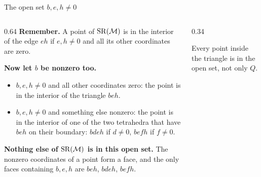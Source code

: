 \begin{frame}{The open set \(b,e,h\ne0\)}
\begin{columns}[c]
\begin{column}{0.64\textwidth}
\textbf{Remember.} A point of \(\operatorname{SR}(\mathcal M)\) is in the interior of the edge \(eh\) if \(e,h\ne0\) and all its other coordinates are zero.
\par\smallskip
\textbf{Now let \(b\) be nonzero too.}
\begin{itemize}
\setlength{\itemsep}{2pt}
\item \(b,e,h\ne0\) and all other coordinates zero: the point is in the interior of the triangle \(beh\).
\item \(b,e,h\ne0\) and something else nonzero: the point is in the interior of one of the two tetrahedra that have \(beh\) on their boundary: \(bdeh\) if \(d\ne0\), \(befh\) if \(f\ne0\).
\end{itemize}
\textbf{Nothing else of \(\operatorname{SR}(\mathcal M)\) is in this open set.} The nonzero coordinates of a point form a face, and the only faces containing \(b,e,h\) are \(beh\), \(bdeh\), \(befh\).
\end{column}
\begin{column}{0.34\textwidth}\centering
{}
\par\smallskip
Every point inside the triangle is in the open set, not only \(Q\).
\end{column}
\end{columns}
\end{frame}


